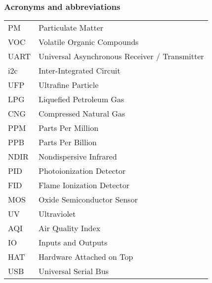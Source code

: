 \subsubsection*{Acronyms and abbreviations}

\begingroup
\renewcommand{\arraystretch}{1.2}
\begin{tabular}{@{}p{2.5cm} l}

	PM		& Particulate Matter\\
	VOC		& Volatile Organic Compounds\\
	UART	& Universal Asynchronous Receiver / Transmitter\\
	i2c		& Inter-Integrated Circuit\\
	UFP		& Ultrafine Particle\\
	LPG		& Liquefied Petroleum Gas\\
	CNG 	& Compressed Natural Gas\\
	PPM		& Parts Per Million\\
	PPB		& Parts Per Billion\\
	NDIR	& Nondispersive Infrared\\
	PID		& Photoionization Detector\\
	FID		& Flame Ionization Detector\\
	MOS		& Oxide Semiconductor Sensor\\
	UV		& Ultraviolet\\
	AQI		& Air Quality Index\\
	IO		& Inputs and Outputs\\
	HAT		& Hardware Attached on Top\\
	USB		& Universal Serial Bus\\
	
\end{tabular}
\endgroup
